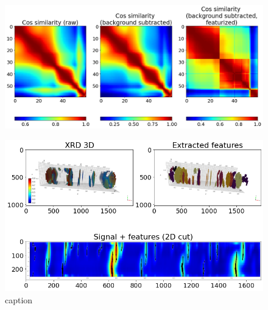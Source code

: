 \documentclass[12pt]{iopart}
\begin{document}
\begin{figure}
  \includegraphics[width=\linewidth]{paper_figures/pkg/5_T_peakfit.png}
\caption{}
  \label{fig:simsquares}
\end{figure}

\begin{figure}[h!]
  \centering
    \includegraphics[width=\linewidth]{paper_figures/pkg/6.png}
  \caption{caption}
  \label{fig:6}
\end{figure}
\end{document}

